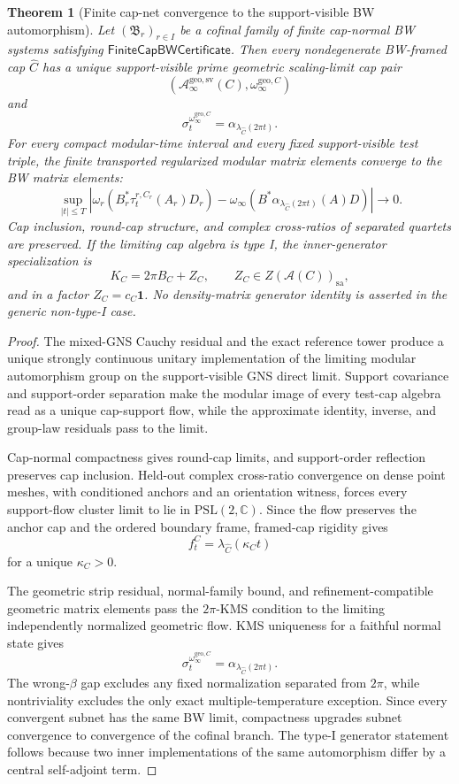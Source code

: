 \documentclass[11pt]{article}
\newtheorem{theorem}{Theorem}[section]
\begin{document}
\begin{theorem}[Finite cap-net convergence to the support-visible BW automorphism]\label{thm:finite-cap-bw-certificate}
Let \((\mathfrak B_r)_{r\in I}\) be a cofinal family of finite cap-normal BW systems satisfying
\(\mathsf{FiniteCapBWCertificate}\). Then every nondegenerate BW-framed cap \(\widehat C\) has a
unique support-visible prime geometric scaling-limit cap pair
\[
(\mathcal A_\infty^{\mathrm{geo,sv}}(C),\omega_\infty^{\mathrm{geo},C})
\]
and
\[
\boxed{\;
\sigma_t^{\omega_\infty^{\mathrm{geo},C}}
=
\alpha_{\lambda_{\widehat C}(2\pi t)} .
\;}
\]
For every compact modular-time interval and every fixed support-visible test triple,
the finite transported regularized modular matrix elements converge to the BW matrix elements:
\[
\sup_{|t|\le T}
\left|
\omega_r(B_r^\ast\tau_t^{r,C_r}(A_r)D_r)
-
\omega_\infty(B^\ast\alpha_{\lambda_{\widehat C}(2\pi t)}(A)D)
\right|\to0 .
\]
Cap inclusion, round-cap structure, and complex cross-ratios of separated quartets are preserved.
If the limiting cap algebra is type I, the inner-generator specialization is
\[
K_C=2\pi B_C+Z_C,\qquad Z_C\in Z(\mathcal A(C))_{\mathrm{sa}},
\]
and in a factor \(Z_C=c_C\mathbf1\). No density-matrix generator identity is asserted in the
generic non-type-I case.
\end{theorem}

\begin{proof}
The mixed-GNS Cauchy residual and the exact reference tower produce a unique strongly continuous
unitary implementation of the limiting modular automorphism group on the support-visible GNS
direct limit. Support covariance and support-order separation make the modular image of every
test-cap algebra read as a unique cap-support flow, while the approximate identity, inverse, and
group-law residuals pass to the limit.

Cap-normal compactness gives round-cap limits, and support-order reflection preserves cap
inclusion. Held-out complex cross-ratio convergence on dense point meshes, with conditioned
anchors and an orientation witness, forces every support-flow cluster limit to lie in
\(\mathrm{PSL}(2,\mathbb C)\). Since the flow preserves the anchor cap and the ordered boundary
frame, framed-cap rigidity gives
\[
f_t^C=\lambda_{\widehat C}(\kappa_C t)
\]
for a unique \(\kappa_C>0\).

The geometric strip residual, normal-family bound, and refinement-compatible geometric matrix
elements pass the \(2\pi\)-KMS condition to the limiting independently normalized geometric flow.
KMS uniqueness for a faithful normal state gives
\[
\sigma_t^{\omega_\infty^{\mathrm{geo},C}}
=\alpha_{\lambda_{\widehat C}(2\pi t)}.
\]
The wrong-\(\beta\) gap excludes any fixed normalization separated from \(2\pi\), while
nontriviality excludes the only exact multiple-temperature exception. Since every convergent
subnet has the same BW limit, compactness upgrades subnet convergence to convergence of the
cofinal branch. The type-I generator statement follows because two inner implementations of the
same automorphism differ by a central self-adjoint term.
\end{proof}
\end{document}
